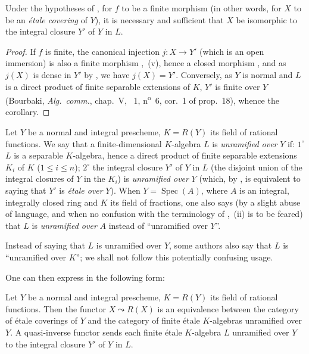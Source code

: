 \begin{corollary}[18.10.9]
\label{IV.18.10.9}
Under the hypotheses of , for $f$ to be a finite morphism \textup{(in other words, for $X$ to be an \emph{\'etale covering} of $Y$)}, it is necessary and sufficient that $X$ be isomorphic to the integral closure $Y'$ of $Y$ in $L$.
\end{corollary}

\begin{proof}
If $f$ is finite, the canonical injection $j:X\to Y'$ (which is an open immersion) is also a finite morphism ,~(v), hence a closed morphism , and as $j(X)$ is dense in $Y'$ by , we have $j(X)=Y'$.
Conversely, as $Y$ is normal and $L$ is a direct product of finite separable extensions of $K$, $Y'$ is finite over $Y$ (Bourbaki, \emph{Alg.\ comm.}, chap.~V, \textsection~1, n\textsuperscript{o}~6, cor.~1 of prop.~18), whence the corollary.
\end{proof}

\begin{env}[18.10.10]
\label{IV.18.10.10}
Let $Y$ be a normal and integral prescheme, $K=R(Y)$ its field of rational functions.
We say that a finite-dimensional $K$-algebra $L$ is \emph{unramified over} $Y$ if: $1^{\circ}$ $L$ is a separable $K$-algebra, hence a direct product of finite separable extensions $K_i$ of $K$ ($1\leq i\leq n$); $2^{\circ}$ the integral closure $Y'$ of $Y$ in $L$ (the disjoint union of the integral closures of $Y$ in the $K_i$) is \emph{unramified over} $Y$ (which, by ,
is equivalent to saying that $Y'$ is \emph{\'etale over} $Y$).
When $Y=\operatorname{Spec}(A)$, where $A$ is an integral, integrally closed ring and $K$ its field of fractions, one also says (by a slight abuse of language, and when no confusion with the terminology of ,~(ii) is to be feared) that $L$ is \emph{unramified over} $A$ instead of ``unramified over $Y$''.
\end{env}

\begin{remark}[18.10.11]
\label{IV.18.10.11}
Instead of saying that $L$ is unramified over $Y$, some authors also say that $L$ is ``unramified over $K$''; we shall not follow this potentially confusing usage.
\end{remark}

One can then express  in the following form:

\begin{corollary}[18.10.12]
\label{IV.18.10.12}
Let $Y$ be a normal and integral prescheme, $K=R(Y)$ its field of rational functions.
Then the functor $X\leadsto R(X)$ is an equivalence between the category of \'etale coverings of $Y$ and the category of finite \'etale $K$-algebras \textup{unramified} over $Y$.
A quasi-inverse functor sends each finite \'etale $K$-algebra $L$ unramified over $Y$ to the integral closure $Y'$ of $Y$ in $L$.
\end{corollary}

